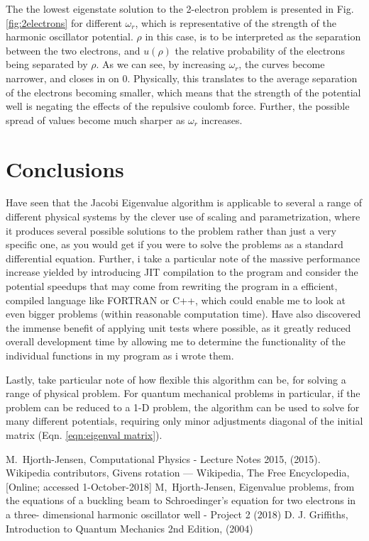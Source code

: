 \documentclass[10pt,showpacs,preprintnumbers,footinbib,amsmath,amssymb,aps,prl,twocolumn,groupedaddress,superscriptaddress,showkeys]{revtex4-1}
\begin{document}
  The the lowest eigenstate solution to the 2-electron problem is presented in Fig. \ref{fig:2electrons} for different $\omega_r$, which is representative of the strength of the harmonic oscillator potential. $\rho$ in this case, is to be interpreted as the separation between the two electrons, and $u(\rho)$ the relative probability of the electrons being separated by $\rho$. As we can see, by increasing $\omega_r$, the curves become narrower, and closes in on $0$. Physically, this translates to the average separation of the electrons becoming smaller, which means that the strength of the potential well is negating the effects of the repulsive coulomb force. Further, the possible spread of values become much sharper as $\omega_r$ increases.

\section{Conclusions}
  Have seen that the Jacobi Eigenvalue algorithm is applicable to several a range of different physical systems by the clever use of scaling and parametrization, where it produces several possible solutions to the problem rather than just a very specific one, as you would get if you were to solve the problems as a standard differential equation. Further, i take a particular note of the massive performance increase yielded by introducing JIT compilation to the program and consider the potential speedups that may come from rewriting the program in a efficient, compiled language like FORTRAN or C++, which could enable me to look at even bigger problems (within reasonable computation time).
  Have also discovered the immense benefit of applying unit tests where possible, as it greatly reduced overall development time by allowing me to determine the functionality of the individual functions in my program as i wrote them.

  Lastly, take particular note of how flexible this algorithm can be, for solving a range of physical problem. For quantum mechanical problems in particular, if the problem can be reduced to a 1-D problem, the algorithm can be used to solve for many different potentials, requiring only minor adjustments diagonal of the initial matrix (Eqn. \ref{eqn:eigenval matrix}).


\begin{thebibliography}{99}
 M.~Hjorth-Jensen, Computational Physics - Lecture Notes 2015, (2015).
 Wikipedia contributors, Givens rotation --- {Wikipedia}{,} The Free Encyclopedia, [Online; accessed 1-October-2018]
 M,~Hjorth-Jensen, Eigenvalue problems, from the equations of a buckling beam
to Schroedinger’s equation for two electrons in a three-
dimensional harmonic oscillator well - Project 2 (2018)
 D. J. Griffiths, Introduction to Quantum Mechanics 2nd Edition, (2004)
\end{thebibliography}
\end{document}

